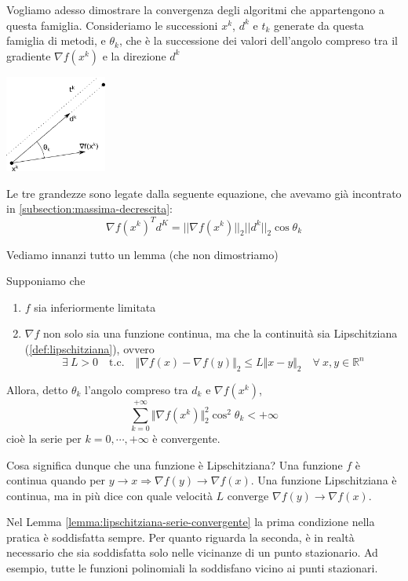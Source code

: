 Vogliamo adesso dimostrare la convergenza degli algoritmi che
appartengono a questa famiglia. Consideriamo le successioni $x^k$,
$d^k$ e $t_k$ generate da questa famiglia di metodi, e $ \theta_{k}$,
che \`e la successione dei valori dell'angolo compreso tra il gradiente
$\nabla f(x^{k})$ e la direzione $d^{k}$

\centerline{\includegraphics[width=0.25\textwidth]{imgs/dir-grad-theta.png}}

Le tre grandezze sono legate dalla seguente equazione, che avevamo gi\`a
incontrato in \ref{subsection:massima-decrescita}:
$$ \nabla f(x^{k})^{T} d^{K} = || \nabla f(x^{k}) ||_2 ||d^{k}||_2 \cos \theta_{k}$$

Vediamo innanzi tutto un lemma (che non dimostriamo)
\begin{lemma}
\label{lemma:lipschitziana-serie-convergente} Supponiamo che
 \begin{enumerate}
  \item $f$ sia inferiormente limitata
  \item $\nabla f$ non solo sia una funzione continua, ma che la
continuit\`a sia Lipschitziana (\ref{def:lipschitziana}), ovvero
      $$ \exists ~ L>0 \quad \text{t.c.} \quad \Vert \nabla f(x) - \nabla f(y) \Vert_{2} \leq L \Vert x - y \Vert_{2} \quad \forall ~ x,y \in \mathbb{R}^n$$
 \end{enumerate} Allora, detto $\theta_{k}$ l'angolo compreso tra $d_k$ e $\nabla f (x^k)$,
$$ \sum_{k=0}^{+\infty} \Vert \nabla f(x^{k}) \Vert_2^2 \cos^{2} \theta_{k} < + \infty$$
cio\`e la serie per $k= 0, \cdots, +\infty $ \`e convergente.
\end{lemma}

\begin{notes} Cosa significa dunque che una funzione \`e Lipschitziana?
Una funzione $f$ \`e continua quando per $y \to x \Longrightarrow \nabla
f(y) \to \nabla f(x)$. Una funzione Lipschitziana \`e continua, ma in
pi\`u dice con quale velocit\`a $L$ converge $\nabla f(y) \to \nabla
f(x)$.
\end{notes}
\begin{notes} Nel Lemma \ref{lemma:lipschitziana-serie-convergente} la
prima condizione nella pratica \`e soddisfatta sempre. Per quanto
riguarda la seconda, \`e in realt\`a necessario che sia soddisfatta solo
nelle vicinanze di un punto stazionario. Ad esempio, tutte le funzioni
polinomiali la soddisfano vicino ai punti stazionari.
\end{notes}

